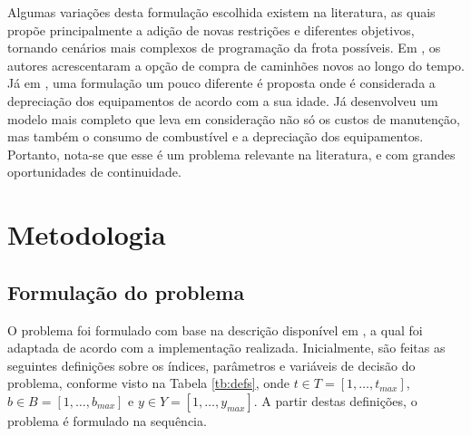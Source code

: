 \documentclass[conference]{IEEEtran}
\begin{document}
Algumas variações desta formulação escolhida existem na literatura, as quais propõe principalmente a adição de novas restrições e diferentes objetivos, tornando cenários mais complexos de programação da frota possíveis. Em \cite{topal2010b}, os autores acrescentaram a opção de compra de caminhões novos ao longo do tempo. Já em \cite{cacetta2016}, uma formulação um pouco diferente é proposta onde é considerada a depreciação dos equipamentos de acordo com a sua idade. Já \cite{nakousi2018} desenvolveu um modelo mais completo que leva em consideração não só os custos de manutenção, mas também o consumo de combustível e a depreciação dos equipamentos. Portanto, nota-se que esse é um problema relevante na literatura, e com grandes oportunidades de continuidade.

\section{Metodologia}

\subsection{Formulação do problema}
O problema foi formulado com base na descrição disponível em \cite{topal2010a}, a qual foi adaptada de acordo com a implementação realizada. Inicialmente, são feitas as seguintes definições sobre os índices, parâmetros e variáveis de decisão do problema, conforme visto na Tabela \ref{tb:defs}, onde $t \in T=[1,\dots,t_{max}]$, $b \in B = [1,\dots,b_{max}]$ e $y \in Y = [1,\dots,y_{max}]$. A partir destas definições, o problema é formulado na sequência.
\end{document}
